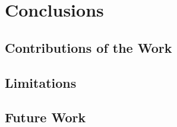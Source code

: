 

\chapter{Conclusions}\label{chapter:Conclusions}

\section{Contributions of the Work}

\section{Limitations}

\section{Future Work}

